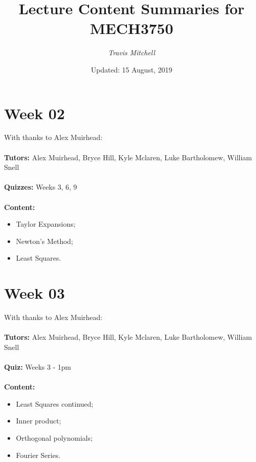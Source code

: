 \documentclass[11pt,a4paper]{report}
\author{\textit{Travis Mitchell}}
\title{Lecture Content Summaries for MECH3750}
\date{Updated: 15 August, 2019}
\begin{document}
	\maketitle
	\clearpage
	
	\begingroup
	\makeatletter
	\let\clearpage\relax
	\vspace*{\fill}
	\vspace*{\dimexpr-50\p@-\baselineskip}
	\chapter*{Week 02}
	With thanks to Alex Muirhead: \\\\
	\textbf{Tutors:} Alex Muirhead, Bryce Hill, Kyle Mclaren, Luke Bartholomew, William Snell \\\\
	\textbf{Quizzes:} Weeks 3, 6, 9 \\\\	
	\textbf{Content:}
	\begin{itemize}
		\item Taylor Expansions;
		\item Newton's Method;
		\item Least Squares.
	\end{itemize}
	\vspace*{\fill}
	\endgroup
	
	
	
	\begingroup
	\makeatletter
	\let\clearpage\relax
	\vspace*{\fill}%
	\vspace*{\dimexpr-50\p@-\baselineskip}
	\chapter*{Week 03}
	With thanks to Alex Muirhead: \\\\
	\textbf{Tutors:} Alex Muirhead, Bryce Hill, Kyle Mclaren, Luke Bartholomew, William Snell \\\\
	\textbf{Quiz:} Weeks 3 - 1pm \\\\	
	\textbf{Content:}
	\begin{itemize}
		\item Least Squares continued;
		\item Inner product;
		\item Orthogonal polynomials;
		\item Fourier Series.
	\end{itemize}
	\vspace*{\fill}
	\endgroup
	
	
\end{document}
